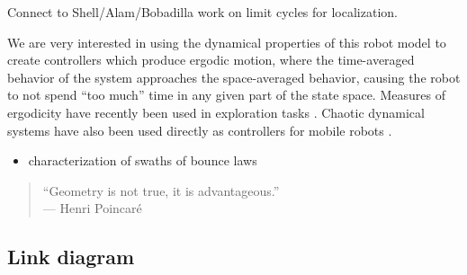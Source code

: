 \documentclass[]{styles/svproc}  %
\begin{document}
Connect to Shell/Alam/Bobadilla work on limit cycles for localization.


We are very interested in using the dynamical properties of this robot model to
create controllers which produce ergodic motion, where the time-averaged
behavior of the system approaches the space-averaged behavior, causing the robot
to not spend ``too much'' time in any given part of the state space. Measures
of ergodicity have recently been used in exploration tasks
\cite{miller2016ergodic}. Chaotic dynamical systems have also been used directly
as controllers for mobile robots \cite{nakamura2001chaotic}.

{\color{red} 
\begin{itemize}
\item characterization of swaths of bounce laws
\end{itemize}
}

%
%
%
\iffalse

{\small
\begin{center}
\begin{quotation}
``Geometry is not true, it is advantageous.'' \\
\hfill    --- Henri Poincar\'e
\end{quotation}
\end{center}
}



\subsection{Link diagram}
\end{document}
